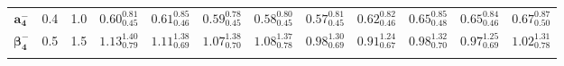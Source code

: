 \begin{tabular}{ c c c c c c c c c c c c}
$\mathbf{a_{4}^{-}}$ & 0.4 & 1.0 & $0.60^{0.81}_{0.45}$ & $0.61^{0.85}_{0.46}$ & $0.59^{0.78}_{0.45}$ & $0.58^{0.80}_{0.45}$ & $0.57^{0.81}_{0.45}$ & $0.62^{0.82}_{0.46}$ & $0.65^{0.85}_{0.48}$ & $0.65^{0.84}_{0.46}$ & $0.67^{0.87}_{0.50}$\\ 
$\mathbf{\beta_{4}^{-}}$ & 0.5 & 1.5 & $1.13^{1.40}_{0.79}$ & $1.11^{1.38}_{0.69}$ & $1.07^{1.38}_{0.70}$ & $1.08^{1.37}_{0.78}$ & $0.98^{1.30}_{0.69}$ & $0.91^{1.24}_{0.67}$ & $0.98^{1.32}_{0.70}$ & $0.97^{1.25}_{0.69}$ & $1.02^{1.31}_{0.78}$\\ 
\\ 
\end{tabular}
\egroup